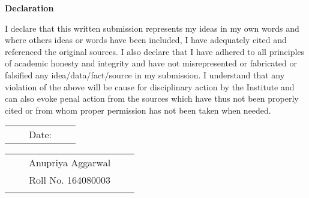 \clearpage
\thispagestyle{empty}

\begin{center}
\Large  {\bf Declaration }
\end{center}
\vspace{-6in}
I declare that this written submission represents my ideas in my own words and where others ideas or words have been included, I have adequately cited and referenced the original sources. I also declare that I have adhered to all principles of academic honesty and integrity and have not misrepresented or fabricated or falsified any idea/data/fact/source in my submission. I understand that any violation of the above will be cause for disciplinary action by the Institute and can also evoke penal action from the sources which have thus not been properly cited or from whom proper permission has not been taken when needed.
\vspace{0.5in}



%
 \begin{table}[h]
 \begin{flushleft}

\vspace{-3.2in} 
 \begin{tabular}{ccccc}
 \rule[5ex]{0pt}{-10ex}&& Date: && \\ 
 \end{tabular}
\end{flushleft}

\vspace{-0.5in} 
\begin{flushright}
 \begin{tabular}{ccccc}
 
 \hline 	\rule[5ex]{0pt}{-10ex}&& Anupriya Aggarwal&& \\ 
 \rule[5ex]{0pt}{-10ex}&& Roll No. 164080003&& \\ \\
 \end{tabular}
\end{flushright}
\end{table}

\pagebreak